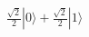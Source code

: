 \documentclass[preview]{standalone}
\begin{document}
\begin{align*}
\frac{\sqrt{2}}{2} |0\rangle+\frac{\sqrt{2}}{2} |1\rangle
\end{align*}
\end{document}

